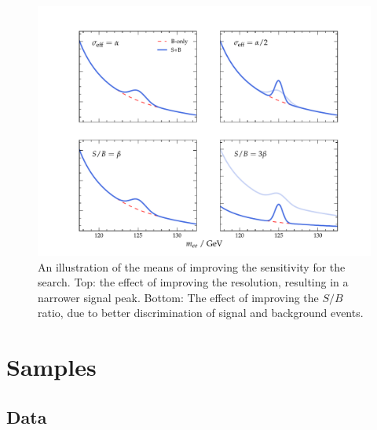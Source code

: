 \begin{figure}[htbp!]                                        
\centering                                                   
\includegraphics[width=0.9\linewidth]{Figures/Hee/Misc/mee_cartoon.pdf}\hfill

\caption[An illustration of the means of improving the sensitivity for the \Hee search.]{An illustration of the means of improving the sensitivity for the \Hee search. Top: the effect of improving the \mee resolution, resulting in a narrower signal peak. Bottom: The effect of improving the $S/B$ ratio, due to better discrimination of signal and background events.}
\label{fig:hee_mee_cartoon}                                 
\end{figure} 

\section{Samples}

\subsection{Data}

